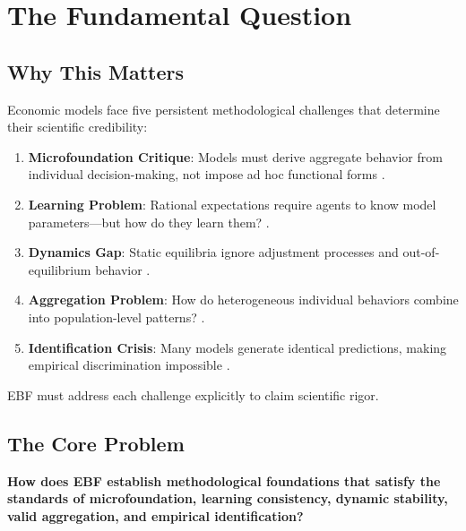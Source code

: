 \section{The Fundamental Question}
\label{sec:az-fundamental}

\subsection{Why This Matters}

Economic models face five persistent methodological challenges that determine
their scientific credibility:

\begin{enumerate}
\item \textbf{Microfoundation Critique}: Models must derive aggregate behavior
from individual decision-making, not impose ad hoc functional forms
\citep{lucas1976econometric}.

\item \textbf{Learning Problem}: Rational expectations require agents to know
model parameters---but how do they learn them? \citep{sargent1993bounded}.

\item \textbf{Dynamics Gap}: Static equilibria ignore adjustment processes and
out-of-equilibrium behavior \citep{arthur2021foundations}.

\item \textbf{Aggregation Problem}: How do heterogeneous individual behaviors
combine into population-level patterns? \citep{kirman1992whom}.

\item \textbf{Identification Crisis}: Many models generate identical predictions,
making empirical discrimination impossible \citep{manski1995identification}.
\end{enumerate}

EBF must address each challenge explicitly to claim scientific rigor.

\subsection{The Core Problem}

\begin{tcolorbox}[colback=red!5!white, colframe=red!75!black,
    title=The Fundamental Question]
\textbf{How does EBF establish methodological foundations that satisfy
the standards of microfoundation, learning consistency, dynamic stability,
valid aggregation, and empirical identification?}
\end{tcolorbox}


